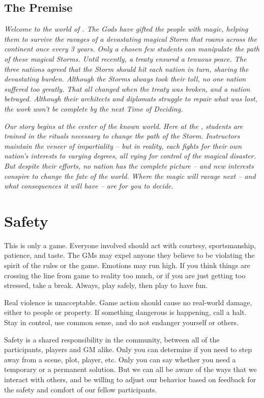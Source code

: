 \documentclass[sheet]{GL2020}
\begin{document}
\subsection{The Premise}
\emph{Welcome to the world of \pEarth{}. The Gods have gifted the people with magic, helping them to survive the ravages of a devastating magical Storm that roams across the continent once every 3 years. Only a chosen few students can manipulate the path of these magical Storms. Until recently, a treaty ensured a tenuous peace. The three nations agreed that the Storm should hit each nation in turn, sharing the devastating burden. Although the Storms always took their toll, no one nation suffered too greatly. That all changed when the treaty was broken, and a nation betrayed. Although their architects and diplomats struggle to repair what was lost, the work won't be complete by the next Time of Deciding.}

\emph{Our story begins at the center of the known world. Here at the \pSchool{}, students are trained in the rituals necessary to change the path of the Storm. Instructors maintain the veneer of impartiality -- but in reality, each fights for their own nation's interests to varying degrees, all vying for control of the magical disaster. But despite their efforts, no nation has the complete picture -- and new interests conspire to change the fate of the world. Where the magic will ravage next -- and what consequences it will have -- are for you to decide.}


\section{Safety}
This is only a game. Everyone involved should act with courtesy, sportsmanship, patience, and taste. The GMs may expel anyone they believe to be violating the spirit of the rules or the game. Emotions may run high. If you think things are crossing the line from game to reality too much, or if you are just getting too stressed, take a break. Always, play safely, then play to have fun. 

Real violence is unacceptable. Game action should cause no real-world damage, either to people or property. If something dangerous is happening, call a halt. Stay in control, use common sense, and do not endanger yourself or others.

Safety is a shared responsibility in the community, between all of the participants, players and GM alike. Only you can determine if you need to step away from a scene, plot, player, etc. Only you can say whether you need a temporary or a permanent solution. But we can all be aware of the ways that we interact with others, and be willing to adjust our behavior based on feedback for the safety and comfort of our fellow participants.
\end{document}
